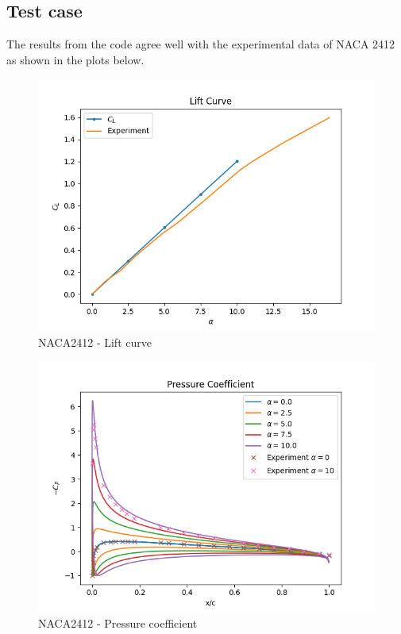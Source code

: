 \documentclass[letterpaper,12pt]{article}
\begin{document}
\subsection{Test case}
The results from the code agree well with the experimental data of NACA 2412 as shown in the plots below.
\begin{figure}[H]
\includegraphics[scale=0.75]{2_cl}
\centering
\caption{NACA2412 - Lift curve}
\end{figure}
\begin{figure}[H]
\includegraphics[scale=0.75]{2_cp}
\centering
\caption{NACA2412 - Pressure coefficient}
\end{figure}

\pagebreak%
\end{document}
